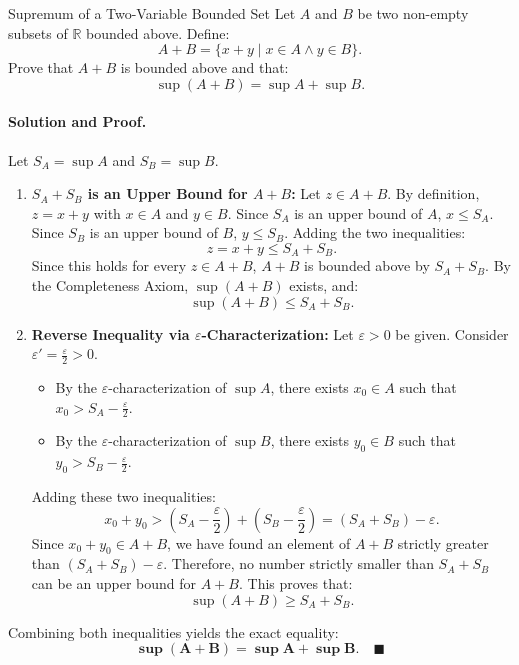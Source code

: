 \begin{workedexample}{Supremum of a Two-Variable Bounded Set}
Let $A$ and $B$ be two non-empty subsets of $\mathbb{R}$ bounded above. Define:
\[
A + B = \{ x + y \mid x \in A \land y \in B \}.
\]
Prove that $A + B$ is bounded above and that:
\[
\sup(A + B) = \sup A + \sup B.
\]

\paragraph{Solution and Proof.}
Let $S_A = \sup A$ and $S_B = \sup B$.
\begin{enumerate}[leftmargin=1.4em,itemsep=3pt]
  \item \textbf{$S_A + S_B$ is an Upper Bound for $A + B$:}
  Let $z \in A + B$. By definition, $z = x + y$ with $x \in A$ and $y \in B$.
  Since $S_A$ is an upper bound of $A$, $x \le S_A$.
  Since $S_B$ is an upper bound of $B$, $y \le S_B$.
  Adding the two inequalities:
  \[
  z = x + y \le S_A + S_B.
  \]
  Since this holds for every $z \in A + B$, $A + B$ is bounded above by $S_A + S_B$.
  By the Completeness Axiom, $\sup(A + B)$ exists, and:
  \[
  \sup(A + B) \le S_A + S_B.
  \]

  \item \textbf{Reverse Inequality via $\varepsilon$-Characterization:}
  Let $\varepsilon > 0$ be given. Consider $\varepsilon' = \frac{\varepsilon}{2} > 0$.
  \begin{itemize}[leftmargin=1.4em,itemsep=2pt]
    \item By the $\varepsilon$-characterization of $\sup A$, there exists $x_0 \in A$ such that $x_0 > S_A - \frac{\varepsilon}{2}$.
    \item By the $\varepsilon$-characterization of $\sup B$, there exists $y_0 \in B$ such that $y_0 > S_B - \frac{\varepsilon}{2}$.
  \end{itemize}
  Adding these two inequalities:
  \[
  x_0 + y_0 > \left( S_A - \frac{\varepsilon}{2} \right) + \left( S_B - \frac{\varepsilon}{2} \right) = (S_A + S_B) - \varepsilon.
  \]
  Since $x_0 + y_0 \in A + B$, we have found an element of $A + B$ strictly greater than $(S_A + S_B) - \varepsilon$.
  Therefore, no number strictly smaller than $S_A + S_B$ can be an upper bound for $A + B$.
  This proves that:
  \[
  \sup(A + B) \ge S_A + S_B.
  \]
\end{enumerate}
Combining both inequalities yields the exact equality:
\[
\mathbf{\sup(A + B) = \sup A + \sup B}. \quad \blacksquare
\]
\end{workedexample}
